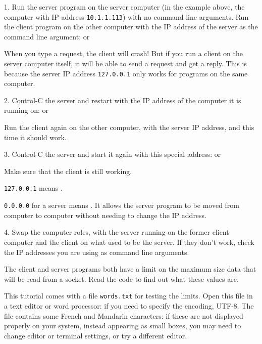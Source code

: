 1. Run the server program on the server computer (in the example above, the computer
with IP address \texttt{10.1.1.113}) with no command line arguments.
Run the client program on the other computer with the IP address of the server
as the command line argument:
or

When you type a request, the client will crash! But if you run a client on the server computer
itself, it will be able to send a request and get a reply. This is because the server IP address
\texttt{127.0.0.1} only works for programs on the same computer.

2. Control-C the server and restart with the IP address of the computer it is running on:
or

Run the client again on the other computer, with the server IP address, and this time
it should work.

3. Control-C the server and start it again with this special address:
or

Make sure that the client is still working.

\begin{IMPORTANT}
\texttt{127.0.0.1} means .

\texttt{0.0.0.0} for a server means . It allows
the server program to be moved from computer to computer without needing to change the
IP address.
\end{IMPORTANT}

4. Swap the computer roles, with the server running on the former client computer and
the client on what used to be the server. If they don't work, check the IP addresses
you are using as command line arguments.



The client and server programs both have a limit on the maximum size data that
will be read from a socket. Read the code to find out what these values are.

This tutorial comes with a file \texttt{words.txt} for testing the limits. Open this
file in a text editor or word processor: if you need to specify the encoding, UTF-8.
The file contains some French and Mandarin characters: if these are not displayed
properly on your system, instead appearing as small boxes, you may need to change
editor or terminal settings, or try a different editor.

